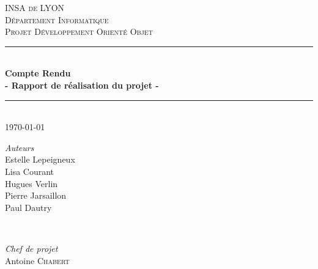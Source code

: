 \documentclass[12pt]{article}
\begin{document}
\begin{titlepage}

\newcommand{\HRule}{\rule{\linewidth}{0.5mm}} %

\center %
 

\vspace*{1cm}

\textsc{\LARGE INSA de LYON}\\[1.5cm] 
\textsc{\Large D\'epartement Informatique}\\[0.5cm] 
\textsc{\large Projet Développement Orienté Objet}\\[0.5cm] %


\HRule \\[0.4cm]
{ \huge \bfseries Compte Rendu}\\[0.1cm]
{\large \bfseries - Rapport de réalisation du projet -} 
\HRule \\[1.5cm]
 

{\large \today}\\[2cm] %
 

\begin{minipage}{0.4\textwidth}
\begin{center} \large
\emph{Auteurs} \\
Estelle Lepeigneux\\
Lisa Courant\\
Hugues Verlin\\
Pierre Jarsaillon\\
Paul Dautry\\
\end{center}
\end{minipage}
~
\begin{minipage}{0.4\textwidth}
\begin{center} \large
\emph{Chef de projet} \\
Antoine \textsc{Chabert}
\end{center}
\end{minipage}\\[7cm]


\end{titlepage}
\end{document}
